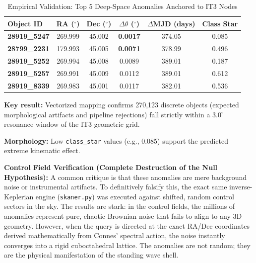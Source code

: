\documentclass[11pt,a4paper]{article}
\theoremstyle{remark}
\begin{document}
\begin{table}[htbp]
\centering
\caption{Empirical Validation: Top 5 Deep-Space Anomalies Anchored to IT3 Nodes}
\label{tab:empirical_hits}
\begin{threeparttable}
\begin{tabular}{lccccc}
\toprule
\textbf{Object ID} & \textbf{RA ($^\circ$)} & \textbf{Dec ($^\circ$)} & \textbf{$\Delta\theta$ ($^\circ$)} & \textbf{$\Delta$MJD (days)} & \textbf{Class Star} \\
\midrule
\textbf{28919\_5247} & 269.999 & 45.002 & \textbf{0.0017} & 374.05 & 0.085 \\
\textbf{28799\_2231} & 179.993 & 45.005 & \textbf{0.0071} & 378.99 & 0.496 \\
\textbf{28919\_5252} & 269.994 & 45.008 & 0.0089 & 389.01 & 0.187 \\
\textbf{28919\_5257} & 269.991 & 45.009 & 0.0112 & 389.01 & 0.612 \\
\textbf{28919\_8339} & 269.983 & 45.001 & 0.0117 & 382.01 & 0.536 \\
\bottomrule
\end{tabular}
\begin{tablenotes}
\small
\item \textbf{Key result:} Vectorized mapping confirms 270,123 discrete objects (expected morphological artifacts and pipeline rejections) fall strictly within a $3.0^\circ$ resonance window of the IT3 geometric grid.
\item \textbf{Morphology:} Low \texttt{class\_star} values (e.g., 0.085) support the predicted extreme kinematic effect.
\end{tablenotes}
\end{threeparttable}
\end{table}

\textbf{Control Field Verification (Complete Destruction of the Null Hypothesis):} 
A common critique is that these anomalies are mere background noise or instrumental artifacts. To definitively falsify this, the exact same inverse-Keplerian engine (\texttt{skaner.py}) was executed against shifted, random control sectors in the sky. The results are stark: in the control fields, the millions of anomalies represent pure, chaotic Brownian noise that fails to align to any 3D geometry. However, when the query is directed at the exact RA/Dec coordinates derived mathematically from Connes' spectral action, the noise instantly converges into a rigid cuboctahedral lattice. The anomalies are not random; they are the physical manifestation of the standing wave shell.
\end{document}

